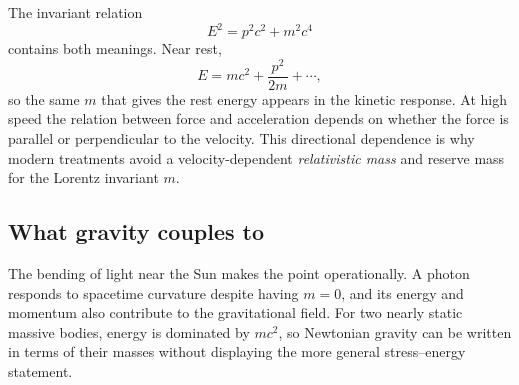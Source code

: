 The invariant relation
\begin{equation}
  E^2=p^2c^2+m^2c^4
  \label{eq:l09-energy-momentum}
\end{equation}
contains both meanings. Near rest,
\begin{equation}
  E=mc^2+\frac{p^2}{2m}+\cdots,
\end{equation}
so the same \(m\) that gives the rest energy appears in the kinetic response.
At high speed the relation between force and acceleration depends on whether
the force is parallel or perpendicular to the velocity. This directional
dependence is why modern treatments avoid a velocity-dependent
\emph{relativistic mass} and reserve mass for the Lorentz invariant \(m\).

\subsection{What gravity couples to}

\begin{classroomqa}
\end{classroomqa}

The bending of light near the Sun makes the point operationally. A photon
responds to spacetime curvature despite having \(m=0\), and its energy and
momentum also contribute to the gravitational field. For two nearly static
massive bodies, energy is dominated by \(mc^2\), so Newtonian gravity can be
written in terms of their masses without displaying the more general
stress--energy statement.

\begin{classroomqa}
\end{classroomqa}

